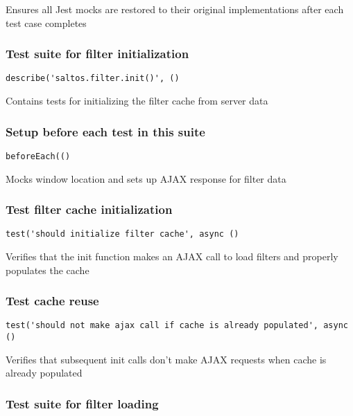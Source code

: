 \documentclass[a4paper]{article}
\begin{document}
Ensures all Jest mocks are restored to their original implementations
after each test case completes

\hypertarget{toc585}{}
\subsubsection{Test suite for filter initialization}

\begin{lstlisting}
describe('saltos.filter.init()', ()
\end{lstlisting}

Contains tests for initializing the filter cache from server data

\hypertarget{toc586}{}
\subsubsection{Setup before each test in this suite}

\begin{lstlisting}
beforeEach(()
\end{lstlisting}

Mocks window location and sets up AJAX response for filter data

\hypertarget{toc587}{}
\subsubsection{Test filter cache initialization}

\begin{lstlisting}
test('should initialize filter cache', async ()
\end{lstlisting}

Verifies that the init function makes an AJAX call to load filters
and properly populates the cache

\hypertarget{toc588}{}
\subsubsection{Test cache reuse}

\begin{lstlisting}
test('should not make ajax call if cache is already populated', async ()
\end{lstlisting}

Verifies that subsequent init calls don't make AJAX requests
when cache is already populated

\hypertarget{toc589}{}
\subsubsection{Test suite for filter loading}
\end{document}

